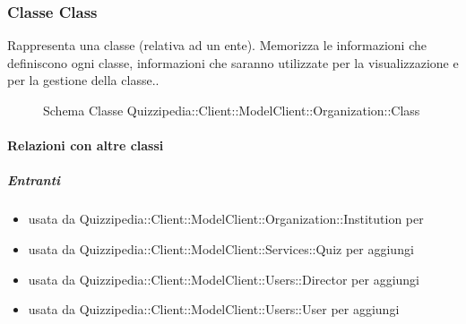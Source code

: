 \subsubsection{Classe Class}
Rappresenta una classe (relativa ad un ente). Memorizza le informazioni che definiscono ogni classe, informazioni che saranno utilizzate per la visualizzazione e per la gestione della classe..
\begin{figure}[H]
\centering
\noindent{}
\caption[Schema Classe Class]{Schema Classe Quizzipedia::Client::ModelClient::Organization::Class}
\end{figure}
\paragraph{Relazioni con altre classi}
\subparagraph{Entranti}
\begin{itemize}
\item usata da Quizzipedia::Client::ModelClient::Organization::Institution per 
\item usata da Quizzipedia::Client::ModelClient::Services::Quiz per aggiungi
\item usata da Quizzipedia::Client::ModelClient::Users::Director per aggiungi
\item usata da Quizzipedia::Client::ModelClient::Users::User per aggiungi
\end{itemize}
